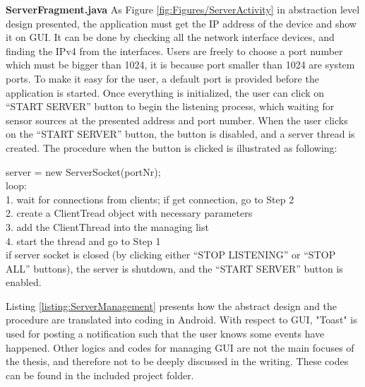 \textbf{ServerFragment.java}
As Figure \ref{fig:Figures/ServerActivity} in abstraction level design presented, the application must get the IP address of the device and show it on GUI. It can be done by checking all the network interface devices, and finding the IPv4 from the interfaces. Users are freely to choose a port number which must be bigger than 1024, it is because port smaller than 1024 are system ports\cite{IANAPORT}. To make it easy for the user, a default port is provided before the application is started. Once everything is initialized, the user can click on “START SERVER” button to begin the listening process, which waiting for sensor sources at the presented address and port number. When the user clicks on the “START SERVER” button, the button is disabled, and a server thread is created. The procedure when the button is clicked is illustrated as following:
\begin{adjustwidth}{1cm}{}
	server = new ServerSocket(portNr);\\
		loop:\\
	1.  wait for connections from clients; if get connection, go to Step 2\\
	2.  create a ClientTread object with necessary parameters\\
	3.  add the ClientThread into the managing list\\
	4.  start the thread and go to Step 1\\
		if server socket is closed (by clicking either “STOP LISTENING” or “STOP ALL” buttons), the server is shutdown, and the “START SERVER” button is enabled.\\
\end{adjustwidth}
Listing \ref{listing:ServerManagement} presents how the abstract design and the procedure are translated into coding in Android. With respect to GUI, "Toast" is used for posting a notification such that the user knows some events have happened. Other logics and codes for managing GUI are not the main focuses of the thesis, and therefore not to be deeply discussed in the writing. These codes can be found in the included project folder.
